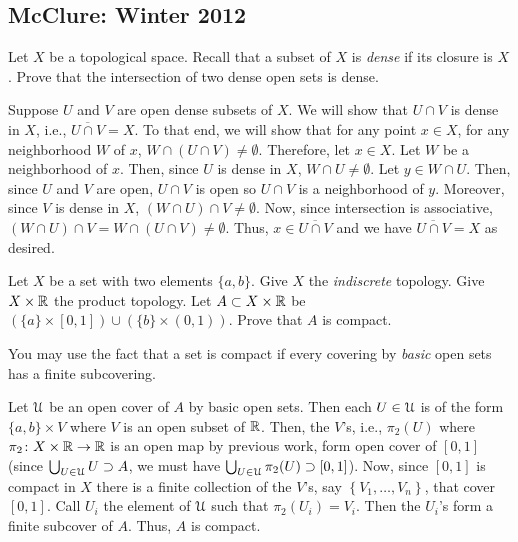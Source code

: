 \subsection{McClure: Winter 2012}
\setcounter{exercise}{0}

\begin{problem}
  Let $X$ be a topological space. Recall that a subset of $X$ is
  \emph{dense} if its closure is $X$. Prove that the intersection of two
  dense open sets is dense.
\end{problem}
\begin{solution}
  Suppose $U$ and $V$ are open dense subsets of $X$. We will show that
  $U\cap V$ is dense in $X$, i.e., $\overline{U\cap V}=X$. To that end, we
  will show that for any point $x\in X$, for any neighborhood $W$ of $x$,
  $W\cap(U\cap V)\neq\emptyset$. Therefore, let $x\in X$. Let $W$ be a
  neighborhood of $x$. Then, since $U$ is dense in $X$,
  $W\cap U\neq\emptyset$. Let $y\in W\cap U$. Then, since $U$ and $V$ are
  open, $U\cap V$ is open so $U\cap V$ is a neighborhood of $y$. Moreover,
  since $V$ is dense in $X$, $(W\cap U)\cap V\neq\emptyset$. Now, since
  intersection is associative,
  $(W\cap U)\cap V=W\cap(U\cap V)\neq\emptyset$. Thus,
  $x\in\overline{U\cap V}$ and we have $\overline{U\cap V}=X$ as desired.
\end{solution}

\begin{problem}
  Let $X$ be a set with two elements $\{a,b\}$. Give $X$ the
  \emph{indiscrete} topology. Give $X\times\mathbb{R}$ the product topology. Let
  $A\subset X\times\mathbb{R}$ be
  $(\{a\}\times[0,1])\cup(\{b\}\times(0,1))$. Prove that $A$ is compact.

  You may use the fact that a set is compact if every covering by
  \emph{basic} open sets has a finite subcovering.
\end{problem}
\begin{solution}
  Let $\mathcal{U}$ be an open cover of $A$ by basic open sets. Then each
  $U\in\mathcal{U}$ is of the form $\{a,b\}\times V$ where $V$ is an open subset
  of $\mathbb{R}$. Then, the $V$'s, i.e., $\pi_2(U)$ where
  $\pi_2\colon X\times\mathbb{R}\to\mathbb{R}$ is an open map by previous work, form
  open cover of $[0,1]$ (since $\bigcup_{U\in\mathcal{U}} U\supset A$, we must
  have $\bigcup_{U\in\mathcal{U}}\pi_2(U)\supset[0,1]$). Now, since $[0,1]$ is
  compact in $X$ there is a finite collection of the $V$'s, say
  $\left\{V_1,\dotsc,V_n\right\}$, that cover $[0,1]$. Call $U_i$ the
  element of $\mathcal{U}$ such that $\pi_2(U_i)=V_i$. Then the $U_i$'s form a
  finite subcover of $A$. Thus, $A$ is compact.
\end{solution}

